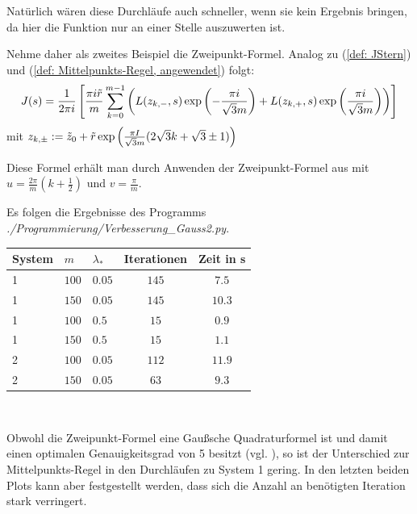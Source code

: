 \documentclass[a4paper,12pt]{report}
\newcommand{\zitat}[1]{\glqq #1\grqq}
\newcommand{\klammer}[1]{\left(#1\right)}
\newcommand{\1}{\mathds{1}}
\theoremstyle{plain} %
\theoremstyle{definition} %
\theoremstyle{remark}
\begin{document}
            Natürlich wären diese Durchläufe auch schneller, wenn sie kein Ergebnis bringen, da hier die Funktion nur an einer Stelle auszuwerten ist.

            Nehme daher als zweites Beispiel die \zitat{Zweipunkt-Formel}\cite[S. 526]{numerikHermann}. Analog zu (\ref{def: JStern}) und (\ref{def: Mittelpunkts-Regel, angewendet}) folgt:
            \begin{align}
                  J(s) = \frac 1 {2\pi i}\left[\frac{\pi i \Tilde r}{m}\sum_{k=0}^{m-1}\klammer{L(z_{k,-}, s)\exp\klammer{-\frac{\pi i}{\sqrt{3}m}}+L(z_{k,+}, s)\exp\klammer{\frac{\pi i}{\sqrt{3}m}}}\right]
            \end{align}
            mit $z_{k,\pm}:=\Tilde z_0+\Tilde r\exp\klammer{\frac{\pi I}{\sqrt{3}m}(2\sqrt 3 k+\sqrt 3 \pm 1)}$

            Diese Formel erhält man durch Anwenden der Zweipunkt-Formel aus \cite[S. 526]{numerikHermann} mit $u= \frac{2\pi}{m}(k+\frac 1 2)$ und $v=\frac \pi m$.

            Es folgen die Ergebnisse des Programms \textit{./Programmierung/Verbesserung\_Gauss2.py}.

            \begin{table}[!ht]
                  \centering
                  \begin{tabular}{lllcc}
                       System & $m$ & $\lambda_*$ & Iterationen & Zeit in s\\
                       \hline
                       1 & $100$ & $0.05$ & $145$ & $7.5$ \\ 
                       1 & $150$ & $0.05$ & $145$ & $10.3$ \\
                       \hline
                       1 & $100$ & $0.5$ & $15$ & $0.9$ \\
                       1 & $150$ & $0.5$ & $15$ & $1.1$ \\
                       \hline
                       2 & $100$ & $0.05$ & $112$ & $11.9$ \\
                       2 & $150$ & $0.05$ & $63$ & $9.3$ \\
                       \hline
                  \end{tabular}\\
                  \label{tab: Ergebnisse_Gauss2}
            \end{table}

            Obwohl die Zweipunkt-Formel eine \zitat{Gaußsche Quadraturformel}\cite[S. 523]{numerikHermann} ist und damit einen optimalen Genauigkeitsgrad von 5 besitzt (vgl. \cite[S. 522f.]{numerikHermann}), so ist der Unterschied zur Mittelpunkts-Regel in den Durchläufen zu System 1 gering.
            In den letzten beiden Plots kann aber festgestellt werden, dass sich die Anzahl an benötigten Iteration stark verringert.
\end{document}
